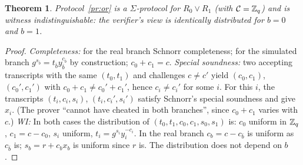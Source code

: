 \documentclass[11pt,a4paper]{report}
\theoremstyle{plain}
\newtheorem{theorem}{Theorem}[chapter]
\theoremstyle{definition}
\theoremstyle{remark}
\begin{document}
\begin{center}
\end{center}
\begin{theorem}
Protocol~\ref{pr:or} is a $\Sigma$-protocol for $R_0\vee R_1$ (with $\mathcal C=\mathbb{Z}_q$) and is \emph{witness indistinguishable}: the verifier's view is identically distributed for $b=0$ and $b=1$.
\end{theorem}
\begin{proof}
\emph{Completeness:} for the real branch Schnorr completeness; for the simulated branch $g^{s_{\bar b}}=t_{\bar b}y_{\bar b}^{c_{\bar b}}$ by construction; $c_0+c_1=c$.
\emph{Special soundness:} two accepting transcripts with the same $(t_0,t_1)$ and challenges $c\ne c'$ yield $(c_0,c_1)$, $(c_0',c_1')$ with $c_0+c_1\ne c_0'+c_1'$, hence $c_i\ne c_i'$ for some $i$. For this $i$, the transcripts $(t_i,c_i,s_i)$, $(t_i,c_i',s_i')$ satisfy Schnorr's special soundness and give $x_i$. (The prover ``cannot have cheated in both branches'', since $c_0+c_1$ varies with $c$.)
\emph{WI:} In both cases the distribution of $(t_0,t_1,c_0,c_1,s_0,s_1)$ is: $c_0$ uniform in $\mathbb{Z}_q$, $c_1=c-c_0$, $s_i$ uniform, $t_i=g^{s_i}y_i^{-c_i}$. In the real branch $c_b=c-c_{\bar b}$ is uniform as $c_{\bar b}$ is; $s_b=r+c_bx_b$ is uniform since $r$ is. The distribution does not depend on $b$.
\end{proof}
\end{document}
